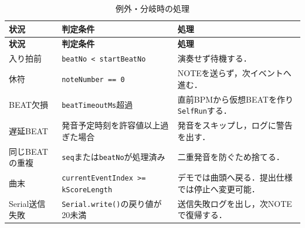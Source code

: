 \documentclass[uplatex,dvipdfmx]{jlreq}
\newcommand{\code}[1]{\texttt{#1}}
\begin{document}
\begin{longtable}{p{}p{}p{}}
\caption{例外・分岐時の処理}\label{tab:saito-exceptions}\\
\toprule
\textbf{状況} & \textbf{判定条件} & \textbf{処理} \\
\midrule
\endfirsthead
\toprule
\textbf{状況} & \textbf{判定条件} & \textbf{処理} \\
\midrule
\endhead
入り拍前 & \code{beatNo < startBeatNo} & 演奏せず待機する．\\
休符 & \code{noteNumber == 0} & NOTEを送らず，次イベントへ進む．\\
BEAT欠損 & \code{beatTimeoutMs}超過 & 直前BPMから仮想BEATを作り\code{SelfRun}する．\\
遅延BEAT & 発音予定時刻を許容値以上過ぎた場合 & 発音をスキップし，ログに警告を出す．\\
同じBEATの重複 & \code{seq}または\code{beatNo}が処理済み & 二重発音を防ぐため捨てる．\\
曲末 & \code{currentEventIndex >= kScoreLength} & デモでは曲頭へ戻る．提出仕様では停止へ変更可能．\\
Serial送信失敗 & \code{Serial.write()}の戻り値が20未満 & 送信失敗ログを出し，次NOTEで復帰する．\\
\bottomrule
\end{longtable}
\end{document}
